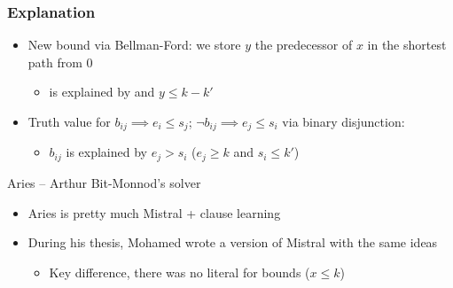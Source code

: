 \begin{frame}
\frametitle{Explanation}

\vfill

\begin{itemize}
  \item New bound  via Bellman-Ford: we store $y$ the predecessor of $x$ in the shortest path from $0$

  \vfill

  \begin{itemize}
    \item {} is explained by  and $y \leq k-k'$
  \end{itemize}

  \vfill

  \item Truth value for $b_{ij} \implies e_i \leq s_j$; $\neg b_{ij} \implies e_j \leq s_i$ via binary disjunction:

\vfill

  \begin{itemize}
    \item $b_{ij}$ is explained by $e_j > s_i$ ($e_j \geq k$ and $s_i \leq k'$)
  \end{itemize}

\end{itemize}

\vfill

\begin{myblock}{Aries -- Arthur Bit-Monnod's solver}
\begin{itemize}
  \item Aries is pretty much Mistral + clause learning

  \vfill
  \item During his thesis, Mohamed wrote a version of Mistral with the same ideas

  \vfill
  \begin{itemize}
    \item Key difference, there was no literal for bounds ($x \leq k$)
  \end{itemize}
\end{itemize}

\end{myblock}

\vfill


\end{frame}
